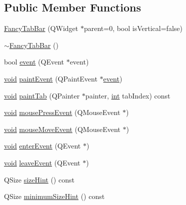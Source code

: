 \subsection*{Public Member Functions}
\begin{DoxyCompactItemize}
\item 
\hyperlink{group___core_plugin_gad575160a4e336a3039a99dc30bee15e3}{Fancy\-Tab\-Bar} (Q\-Widget $\ast$parent=0, bool is\-Vertical=false)
\item 
\hyperlink{group___core_plugin_ga5b40eca6caec361b4bc7f371468927dc}{$\sim$\-Fancy\-Tab\-Bar} ()
\item 
bool \hyperlink{group___core_plugin_ga61b546d0e4aa631e9b223a5da9358a31}{event} (Q\-Event $\ast$event)
\item 
\hyperlink{group___u_a_v_objects_plugin_ga444cf2ff3f0ecbe028adce838d373f5c}{void} \hyperlink{group___core_plugin_gacffef3ad6d0b595db42d532043ba064c}{paint\-Event} (Q\-Paint\-Event $\ast$\hyperlink{group___core_plugin_ga61b546d0e4aa631e9b223a5da9358a31}{event})
\item 
\hyperlink{group___u_a_v_objects_plugin_ga444cf2ff3f0ecbe028adce838d373f5c}{void} \hyperlink{group___core_plugin_gaf99f17cc16adc2741f28115358888282}{paint\-Tab} (Q\-Painter $\ast$painter, \hyperlink{ioapi_8h_a787fa3cf048117ba7123753c1e74fcd6}{int} tab\-Index) const 
\item 
\hyperlink{group___u_a_v_objects_plugin_ga444cf2ff3f0ecbe028adce838d373f5c}{void} \hyperlink{group___core_plugin_ga233783eaace38242dab543caa3081f7f}{mouse\-Press\-Event} (Q\-Mouse\-Event $\ast$)
\item 
\hyperlink{group___u_a_v_objects_plugin_ga444cf2ff3f0ecbe028adce838d373f5c}{void} \hyperlink{group___core_plugin_ga62d3b78d5a2de6843a7ccaaf82928113}{mouse\-Move\-Event} (Q\-Mouse\-Event $\ast$)
\item 
\hyperlink{group___u_a_v_objects_plugin_ga444cf2ff3f0ecbe028adce838d373f5c}{void} \hyperlink{group___core_plugin_gacd1e12691b9857f46777d7fdfe6d5cb2}{enter\-Event} (Q\-Event $\ast$)
\item 
\hyperlink{group___u_a_v_objects_plugin_ga444cf2ff3f0ecbe028adce838d373f5c}{void} \hyperlink{group___core_plugin_gabbbfe787a32c59bd8cd36a165d6a665d}{leave\-Event} (Q\-Event $\ast$)
\item 
Q\-Size \hyperlink{group___core_plugin_gac7cd7091fc9e84d116935f64f510d3b3}{size\-Hint} () const 
\item 
Q\-Size \hyperlink{group___core_plugin_gaf8f470f82a3959c7bdc7a98340148bba}{minimum\-Size\-Hint} () const 
\item 

\end{DoxyCompactItemize}
